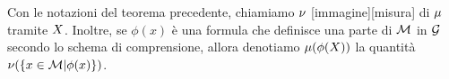 \begin{Definition}
  Con le notazioni del teorema precedente, chiamiamo $\nu$
  [immagine][misura] di $\mu$ tramite
  $X$.
  Inoltre, se $\phi(x)$ \`e una formula che definisce una parte di
  $\mathcal{M}$ in $\mathcal{G}$ secondo lo schema di comprensione,
  allora denotiamo $\mu (\phi(X))$ la quantit\`a
  $\nu(\lbrace x \in \mathcal{M} | \phi(x) \rbrace)$.
\end{Definition}
